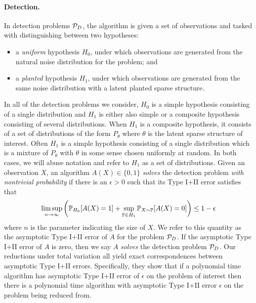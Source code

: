 \paragraph{Detection.} In detection problems $\mathcal{P}_D$, the algorithm is given a set of observations and tasked with distinguishing between two hypotheses:
\begin{itemize}
\item a \emph{uniform} hypothesis $H_0$, under which observations are generated from the natural noise distribution for the problem; and
\item a \emph{planted} hypothesis $H_1$, under which observations are generated from the same noise distribution with a latent planted sparse structure.
\end{itemize}
In all of the detection problems we consider, $H_0$ is a simple hypothesis consisting of a single distribution and $H_1$ is either also simple or a composite hypothesis consisting of several distributions. When $H_1$ is a composite hypothesis, it consists of a set of distributions of the form $P_\theta$ where $\theta$ is the latent sparse structure of interest. Often $H_1$ is a simple hypothesis consisting of a single distribution which is a mixture of $P_\theta$ with $\theta$ in some sense chosen uniformly at random. In both cases, we will abuse notation and refer to $H_1$ as a set of distributions. Given an observation $X$, an algorithm $A(X) \in \{0, 1\}$ \emph{solves} the detection problem \emph{with nontrivial probability} if there is an $\epsilon > 0$ such that its Type I$+$II error satisfies that
$$\limsup_{n \to \infty} \left( \mathbb{P}_{H_0}[A(X) = 1] + \sup_{\mathbb{P} \in H_1} \mathbb{P}_{X \sim \mathbb{P}}[A(X) = 0] \right) \le 1 - \epsilon$$
where $n$ is the parameter indicating the size of $X$. We refer to this quantity as the asymptotic Type I$+$II error of $A$ for the problem $\mathcal{P}_D$. If the asymptotic Type I$+$II error of $A$ is zero, then we say $A$ \emph{solves} the detection problem $\mathcal{P}_D$. Our reductions under total variation all yield exact correspondences between asymptotic Type I$+$II errors. Specifically, they show that if a polynomial time algorithm has asymptotic Type I$+$II error of $\epsilon$ on the problem of interest then there is a polynomial time algorithm with asymptotic Type I$+$II error $\epsilon$ on the problem being reduced from.

